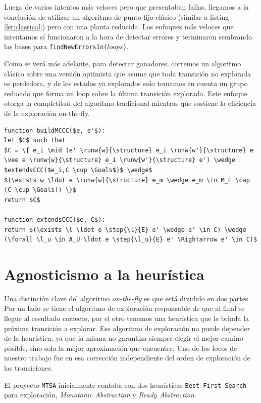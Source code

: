 Luego de varios intentos más veloces pero que presentaban fallas, llegamos a la conclusión de utilizar un algoritmo de punto fijo clásico (similar a listing \ref{lst:classical}) pero con una planta reducida. Los enfoques más veloces que intentamos sí funcionaron a la hora de detectar errores y terminaron sembrando las bases para \texttt{findNewErrorsIn($loops$)}.

Como se verá más adelante, para detectar ganadores, corremos un algoritmo clásico sobre una versión optimista que asume que toda transición no explorada es perdedora, y de los estados ya explorados solo tomamos en cuenta un grupo reducido que forma un loop sobre la última transición explorada. Este enfoque otorga la completitud del algoritmo tradicional mientras que sostiene la eficiencia de la exploración on-the-fly.

\begin{lstlisting}[language={pseudocode},label={lst:viejoMCCC},caption={vieja descripción estados ganadores},float=ht, frame=single]
function buildMCCC($e, e'$):
let $C$ such that
$C = \{ e_i \mid (e' \runw{w}{\structure} e_i \runw{w'}{\structure} e \vee e \runw{w}{\structure} e_i \runw{w'}{\structure} e') \wedge $extendsCCC($e_i,C \cup \Goals$)$ \wedge$
$(\exists w \ldot e \runw{w}{\structure} e_m \wedge e_m \in M_E \cap (C \cup \Goals)) \}$
return $C$

function extendsCCC($e, C$):
return $(\exists \l \ldot e \step{\l}{E} e' \wedge e' \in C) \wedge (\forall \l_u \in A_U \ldot e \step{\l_u}{E} e' \Rightarrow e' \in C)$

\end{lstlisting}

\section{Agnosticismo a la heurística}

Una distinción clave del algoritmo \textit{on-the-fly} es que está dividido en dos partes. Por un lado se tiene el algoritmo de exploración responsable de que al final se llegue al resultado correcto, por el otro tenemos una heurística que le brinda la próxima transición a explorar. Ese algoritmo de exploración no puede depender de la heurística, ya que la misma no garantiza siempre elegir el mejor camino posible, sino solo la mejor aproximación que encuentre. Uno de los focos de nuestro trabajo fue en esa corrección independiente del orden de exploración de las transiciones.

El proyecto \texttt{MTSA} inicialmente contaba con dos heurísticas \texttt{Best First Search} para exploración, \textit{Monotonic Abstraction} y \textit{Ready Abstraction}. 

